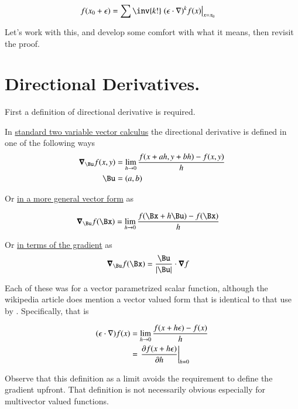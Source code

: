 \documentclass{article}
\begin{document}
\begin{align}\label{eqn:taylorMulti}
f(x_0 + \epsilon) 
&= \sum \inv{k!} \left. {(\epsilon \cdot \grad)^k} f(x) \right\vert_{x=x_0}
\end{align}

Let's work with this, and develop some comfort with what it means, then revisit the proof.

\section{ Directional Derivatives. }

First a definition of directional derivative is required.

In 
\href{http://tutorial.math.lamar.edu/Classes/CalcIII/DirectionalDeriv.aspx}{standard two variable vector calculus} the directional derivative is defined in one of the following ways
\begin{align}
\spacegrad_\Bu f(x,y) &= \lim_{h \rightarrow 0} \frac{f(x + a h, y + b h) - f(x,y)}{h} \\
\Bu &= (a,b)
\end{align}

Or \href{http://en.wikipedia.org/wiki/Directional_derivative}{in a more general vector form} as 

\begin{align}
\spacegrad_\Bu f(\Bx) &= \lim_{h \rightarrow 0} \frac{f(\Bx + h\Bu) - f(\Bx)}{h}
\end{align}

Or \href{http://mathworld.wolfram.com/DirectionalDerivative.html}{in terms of the gradient} as 
\begin{align}
\spacegrad_\Bu f(\Bx) &= \frac{\Bu}{\Abs{\Bu}} \cdot \spacegrad f
\end{align}

Each of these was for a vector parametrized scalar function, although the wikipedia article does mention a vector valued form
that is identical to that use by \cite{doran2003gap}.  Specifically, that is

\begin{align}
(\epsilon \cdot \grad) f(x) 
&= \lim_{h \rightarrow 0} \frac{f(x + h \epsilon) - f(x)}{h} \\
&= \left. \PD{h}{f(x + h \epsilon)} \right\vert_{h=0}
\end{align}

Observe that this definition as a limit avoids the requirement to define the gradient upfront.  That definition is not necessarily 
obvious especially for multivector valued functions.
\end{document}
